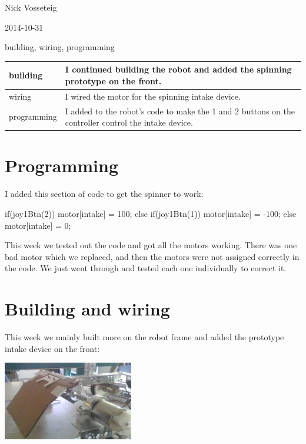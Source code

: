 \usepackage{listings}

Nick Vosseteig

2014-10-31

building, wiring, programming

\begin{tabular}{|p{5cm}|p{5cm}|}
 \hline
 building&
I continued building the robot and added the spinning prototype on the front.
 \\
 \hline
wiring&
I wired the motor for the spinning intake device.
 \\
 \hline
programming&
I added to the robot's code to make the 1 and 2 buttons on the controller control the intake device.
 \\
 \hline
\end{tabular}

\section*{Programming}
I added this section of code to get the spinner to work:
\begin{listing}	
	if(joy1Btn(2)){
		motor[intake] = 100;
		}else if(joy1Btn(1)){
		motor[intake] = -100;
		}else{
		motor[intake] = 0;
	}
\end{listing}
This week we tested out the code and got all the  motors working. There was one bad motor which we replaced, and then the motors were not assigned correctly in the code. We just went through and tested each one individually to correct it.

\section*{Building and wiring}
This week we mainly built more on the robot frame and added the prototype intake device on the front:

\begin{center}
 \includegraphics[width=215px]{./Entries/Images/intake_device2.jpg}
\end{center}